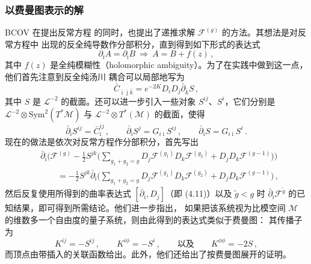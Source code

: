 
\subsubsection*{以费曼图表示的解}

BCOV 在提出反常方程 \cite{ref19} 的同时，也提出了递推求解 $\mathcal{F}^{(g)}$ 的方法。其想法是对反常方程中
出现的反全纯导数作分部积分，直到得到如下形式的表达式
\[
  \partial_{\bar\imath}A=\partial_{\bar\imath}B\ \Rightarrow\ A=B+f(z)\,,
\]
其中 $f(z)$ 是全纯模糊性（holomorphic ambiguity）。为了在实践中做到这一点，他们首先注意到反全纯汤川
耦合可以局部地写为
\[
  \bar C_{\bar\imath\bar\jmath\bar k}=e^{-2K}D_iD_j\bar\partial_{\bar k}S\,,
\]
其中 $S$ 是 $\mathcal{L}^{-2}$ 的截面。还可以进一步引入一些对象 $S^{ij}$、$S^i$，它们分别是
$\mathcal{L}^{-2}\otimes\mathrm{Sym}^2(T^*\mathcal{M})$ 与 $\mathcal{L}^{-2}\otimes
T^*(\mathcal{M})$ 的截面，使得
\begin{equation}
  \bar\partial_{\bar\imath}S^{ij}=\bar C^{ij}_{\bar\imath}\,,\qquad
  \bar\partial_{\bar\imath}S^j=G_{i\bar\imath}S^{ij}\,,\qquad
  \bar\partial_{\bar\imath}S=G_{i\bar\imath}S^i\,.
  \tag{4.27}
  \label{eq:4.27}
\end{equation}
现在的做法是依次对反常方程作分部积分，首先写出
\begin{equation}
  \begin{aligned}
    &\bar\partial_{\bar\imath}\Big(\mathcal{F}^{(g)}
      -\frac12S^{jk}\Big(\sum_{g_1+g_2=g}D_j\mathcal{F}^{(g_1)}D_k\mathcal{F}^{(g_2)}
      +D_jD_k\mathcal{F}^{(g-1)}\Big)\Big)\\
    &\qquad=-\frac12S^{jk}\bar\partial_{\bar\imath}
      \Big(\sum_{g_1+g_2=g}D_j\mathcal{F}^{(g_1)}D_k\mathcal{F}^{(g_2)}
      +D_jD_k\mathcal{F}^{(g-1)}\Big)\,,
  \end{aligned}
  \tag{4.28}
  \label{eq:4.28}
\end{equation}
然后反复使用所得到的曲率表达式 $[\bar\partial_{\bar\imath},D_j]$（即 (4.11)）以及 $\tilde g<g$ 时
$\bar\partial_{\bar\imath}\mathcal{F}^{\tilde g}$ 的已知结果，即可得到所需结论。他们进一步指出，
如果把该系统视为比模空间 $\mathcal{M}$ 的维数多一个自由度的量子系统，则由此得到的表达式类似于费曼图：
其传播子为
\[
  K^{ij}=-S^{ij}\,,\qquad K^{i\phi}=-S^i\,,\qquad\text{以及}\qquad K^{\phi\phi}=-2S\,,
\]
而顶点由带插入的关联函数给出。此外，他们还给出了按费曼图展开的证明。

